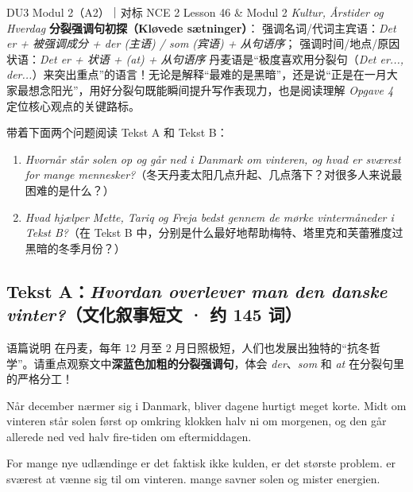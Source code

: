 {DU3 Modul 2（A2）｜对标 NCE 2 Lesson 46 \& Modul 2 \textit{Kultur, Årstider og Hverdag}}
{\textbf{分裂强调句初探（Kløvede sætninger）}： 强调名词/代词主宾语：\textit{Det er + 被强调成分 + der (主语) / som (宾语) + 从句语序}； 强调时间/地点/原因状语：\textit{Det er + 状语 + (at) + 从句语序}}
{丹麦语是“极度喜欢用分裂句（\textit{Det er..., der...}）来突出重点”的语言！无论是解释“最难的是黑暗”，还是说“正是在一月大家最想念阳光”，用好分裂句既能瞬间提升写作表现力，也是阅读理解 \textit{Opgave 4} 定位核心观点的关键路标。}

\begin{foerduleaeser}
带着下面两个问题阅读 Tekst A 和 Tekst B：
\begin{enumerate}
  \item \textit{Hvornår står solen op og går ned i Danmark om vinteren, og hvad er sværest for mange mennesker?}（冬天丹麦太阳几点升起、几点落下？对很多人来说最困难的是什么？）
  \item \textit{Hvad hjælper Mette, Tariq og Freja bedst gennem de mørke vintermåneder i Tekst B?}（在 Tekst B 中，分别是什么最好地帮助梅特、塔里克和芙蕾雅度过黑暗的冬季月份？）
\end{enumerate}
\end{foerduleaeser}


\subsection*{Tekst A：\textit{Hvordan overlever man den danske vinter?}（文化叙事短文 · 约 145 词）}

\begin{tipbox}{语篇说明}
在丹麦，每年 12 月至 2 月日照极短，人们也发展出独特的“抗冬哲学”。请重点观察文中\textbf{\color{NCDNavy}深蓝色加粗的分裂强调句}，体会 \textit{der}、\textit{som} 和 \textit{at} 在分裂句里的严格分工！
\end{tipbox}

Når december nærmer sig i Danmark, bliver dagene hurtigt meget korte. Midt om vinteren står solen først op omkring klokken halv ni om morgenen, og den går allerede ned ved halv fire-tiden om eftermiddagen.

For mange nye udlændinge er det faktisk ikke kulden,  er det største problem.  er sværest at vænne sig til om vinteren.  mange savner solen og mister energien.

